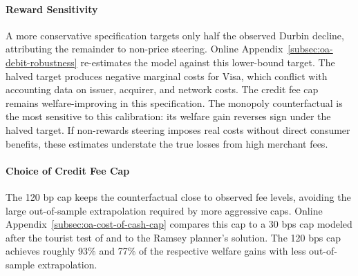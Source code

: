 \documentclass[main.tex]{subfiles}
\begin{document}
\paragraph{Reward Sensitivity}
\label{subsubsec:reward-sensitivity}
A more conservative specification targets only half the observed Durbin decline, attributing the remainder to non-price steering.
Online Appendix~\ref{subsec:oa-debit-robustness} re-estimates the model against this lower-bound target.
The halved target produces negative marginal costs for Visa, which conflict with accounting data on issuer, acquirer, and network costs.
The credit fee cap remains welfare-improving in this specification.
The monopoly counterfactual is the most sensitive to this calibration: its welfare gain reverses sign under the halved target.
If non-rewards steering imposes real costs without direct consumer benefits, these estimates understate the true losses from high merchant fees.

\paragraph{Choice of Credit Fee Cap}
The 120 bp cap keeps the counterfactual close to observed fee levels, avoiding the large out-of-sample extrapolation required by more aggressive caps.
Online Appendix~\ref{subsec:oa-cost-of-cash-cap} compares this cap to a 30 bps cap modeled after the tourist test of \textcite{Rochet.Tirole2011} and to the Ramsey planner's solution.
The 120 bps cap achieves roughly 93\% and 77\% of the respective welfare gains with less out-of-sample extrapolation.
\end{document}
